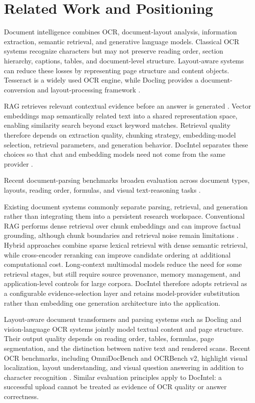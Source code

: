 \documentclass[conference]{IEEEtran}
\begin{document}
\section{Related Work and Positioning}
Document intelligence combines OCR, document-layout analysis, information extraction, semantic retrieval, and generative language models. Classical OCR systems recognize characters but may not preserve reading order, section hierarchy, captions, tables, and document-level structure. Layout-aware systems can reduce these losses by representing page structure and content objects. Tesseract is a widely used OCR engine, while Docling provides a document-conversion and layout-processing framework \cite{tesseract2026,docling2024,doclingDocs2026}.

RAG retrieves relevant contextual evidence before an answer is generated \cite{ragSurvey2024}. Vector embeddings map semantically related text into a shared representation space, enabling similarity search beyond exact keyword matches. Retrieval quality therefore depends on extraction quality, chunking strategy, embedding-model selection, retrieval parameters, and generation behavior. DocIntel separates these choices so that chat and embedding models need not come from the same provider \cite{docintel}.

Recent document-parsing benchmarks broaden evaluation across document types, layouts, reading order, formulas, and visual text-reasoning tasks \cite{omnidocbench2025,ocrBenchV2}.

Existing document systems commonly separate parsing, retrieval, and generation rather than integrating them into a persistent research workspace. Conventional RAG performs dense retrieval over chunk embeddings and can improve factual grounding, although chunk boundaries and retrieval noise remain limitations \cite{ragSurvey2024,ragEval2024}. Hybrid approaches combine sparse lexical retrieval with dense semantic retrieval, while cross-encoder reranking can improve candidate ordering at additional computational cost. Long-context multimodal models reduce the need for some retrieval stages, but still require source provenance, memory management, and application-level controls for large corpora. DocIntel therefore adopts retrieval as a configurable evidence-selection layer and retains model-provider substitution rather than embedding one generation architecture into the application.

Layout-aware document transformers and parsing systems such as Docling and vision-language OCR systems jointly model textual content and page structure. Their output quality depends on reading order, tables, formulas, page segmentation, and the distinction between native text and rendered scans. Recent OCR benchmarks, including OmniDocBench and OCRBench v2, highlight visual localization, layout understanding, and visual question answering in addition to character recognition \cite{omnidocbench2025,ocrBenchV2}. Similar evaluation principles apply to DocIntel: a successful upload cannot be treated as evidence of OCR quality or answer correctness.
\end{document}
